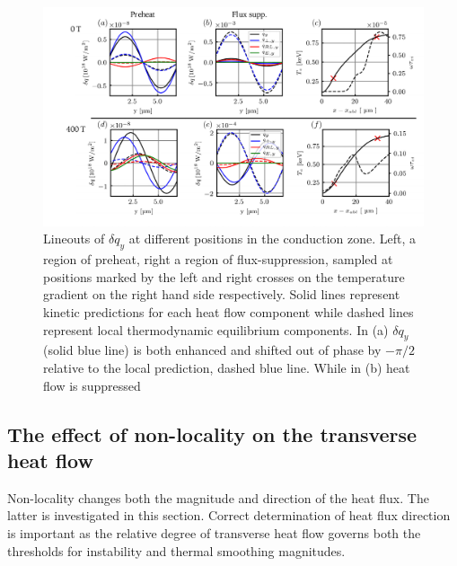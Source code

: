 \documentclass[aip,reprint]{revtex4-1}
\begin{document}
\begin{figure}
		\includegraphics[width=1.0\textwidth]{pics/dqy_LT2_0T_400T_2.pdf}
	\caption{\label{fig:heatflow_phase_shift} Lineouts of $\delta q_{y}$ at different positions in the conduction zone. Left, a region of preheat, right a region of flux-suppression, sampled at positions marked by the left and right crosses on the temperature gradient on the right hand side respectively. Solid lines represent kinetic predictions for each heat flow component while dashed lines represent local thermodynamic equilibrium components. In (a) $\delta q_{y}$ (solid blue line) is both enhanced and shifted out of phase by $-\pi/2$ relative to the local prediction, dashed blue line. While in (b) heat flow is suppressed }
\end{figure}

\subsection{The effect of non-locality on the transverse heat flow}
\label{sec:non-locality-2D}

Non-locality changes both the magnitude and direction of the heat flux. The latter is investigated in this section. Correct determination of heat flux direction is important as the relative degree of transverse heat flow governs both the thresholds for instability and thermal smoothing magnitudes. 
\end{document}
